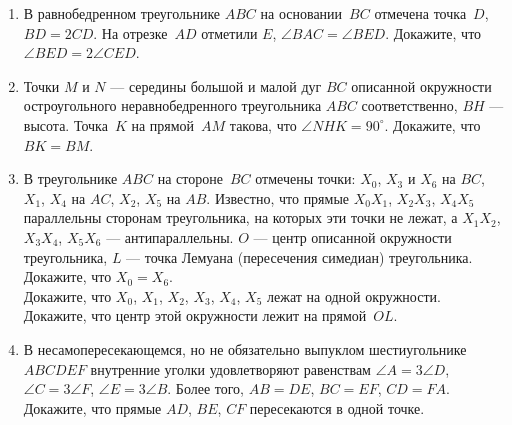 \begin{enumerate}
\item
В равнобедренном треугольнике $ABC$ на основании~$BC$ отмечена точка~$D$,
$BD = 2 CD$.
На отрезке~$AD$ отметили $E$, $\angle BAC = \angle BED$.
Докажите, что $\angle BED = 2 \angle CED$.

\item
Точки $M$ и $N$ --- середины большой и малой дуг $BC$ описанной окружности
остроугольного неравнобедренного треугольника $ABC$ соответственно,
$BH$ --- высота.
Точка~$K$ на прямой~$AM$ такова, что $\angle NHK = 90^{\circ}$.
Докажите, что $BK = BM$.

\item
В треугольнике $ABC$ на стороне~$BC$ отмечены точки:
$X_0$, $X_3$ и $X_6$ на $BC$,
$X_1$, $X_4$ на $AC$, $X_2$, $X_5$ на $AB$.
Известно, что прямые $X_0 X_1$, $X_2 X_3$, $X_4 X_5$ параллельны сторонам
треугольника, на которых эти точки не лежат,
а $X_1 X_2$, $X_3 X_4$, $X_5 X_6$ --- антипараллельны.
$O$ --- центр описанной окружности треугольника, $L$ --- точка Лемуана
(пересечения симедиан) треугольника.
\\
\sp
Докажите, что $X_0 = X_6$.
\\
\sp
Докажите, что $X_0$, $X_1$, $X_2$, $X_3$, $X_4$, $X_5$ лежат на одной
окружности.
\\
\sp
Докажите, что центр этой окружности лежит на прямой~$OL$.

\item
В несамопересекающемся, но не обязательно выпуклом шестиугольнике $ABCDEF$
внутренние уголки удовлетворяют равенствам
$\angle A = 3 \angle D$, $\angle C = 3 \angle F$, $\angle E = 3 \angle B$.
Более того, $AB = DE$, $BC = EF$, $CD = FA$.
Докажите, что прямые $AD$, $BE$, $CF$ пересекаются в одной точке.

\end{enumerate}

